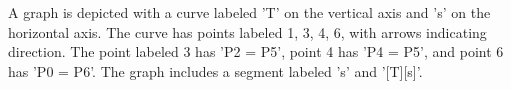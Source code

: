 A graph is depicted with a curve labeled 'T' on the vertical axis and 's' on the horizontal axis. The curve has points labeled 1, 3, 4, 6, with arrows indicating direction. The point labeled 3 has 'P2 = P5', point 4 has 'P4 = P5', and point 6 has 'P0 = P6'. The graph includes a segment labeled 's' and '[T][s]'.